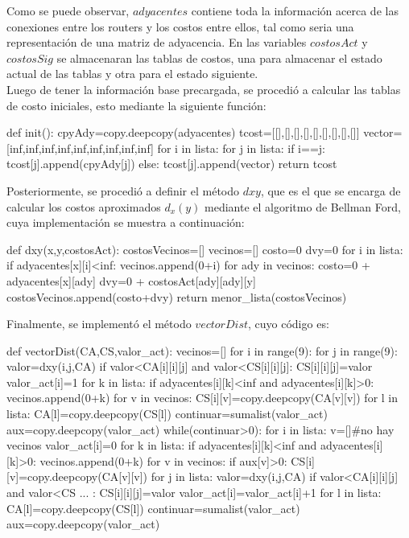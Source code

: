 \documentclass{article}
\begin{document}
Como se puede observar, $adyacentes$ contiene toda la información acerca de las conexiones entre los routers y los costos entre ellos, tal como seria una representación de una matriz de adyacencia. En las variables $costosAct$ y $costosSig$ se almacenaran las tablas de costos, una para almacenar el estado actual de las tablas y otra para el estado siguiente.\\
Luego de tener la información base precargada, se procedió a calcular las tablas de costo iniciales, esto mediante la siguiente función:
\begin{python}

def init():
    cpyAdy=copy.deepcopy(adyacentes)
    tcost=[[],[],[],[],[],[],[],[],[]]
    vector=[inf,inf,inf,inf,inf,inf,inf,inf,inf]
    for i in lista:
        for j in lista:
            if i==j:
                tcost[j].append(cpyAdy[j])
            else:
                tcost[j].append(vector)
    return tcost
\end{python}

Posteriormente, se procedió a definir el método $dxy$, que es el que se encarga de calcular los costos aproximados $d_x(y)$ mediante el algoritmo de Bellman Ford, cuya implementación se muestra a continuación:

\begin{python}
def dxy(x,y,costosAct):
    costosVecinos=[]
    vecinos=[]
    costo=0
    dvy=0
    for i in lista:
        if adyacentes[x][i]<inf:
            vecinos.append(0+i)
        for ady in vecinos:
            costo=0 + adyacentes[x][ady]
            dvy=0 + costosAct[ady][ady][y]
            costosVecinos.append(costo+dvy)
    return menor_lista(costosVecinos)
\end{python}

Finalmente, se implementó el método $vectorDist$, cuyo código es:

\begin{python}
def vectorDist(CA,CS,valor_act):
    vecinos=[]
    for i in range(9):
        for j in range(9):
            valor=dxy(i,j,CA)
            if valor<CA[i][i][j] and valor<CS[i][i][j]:
                CS[i][i][j]=valor
                valor_act[i]=1
            for k in lista:
                if adyacentes[i][k]<inf and adyacentes[i][k]>0:
                    vecinos.append(0+k)
            for v in vecinos:
                CS[i][v]=copy.deepcopy(CA[v][v])
    for l in lista:
        CA[l]=copy.deepcopy(CS[l])
    continuar=sumalist(valor_act)
    aux=copy.deepcopy(valor_act)
    while(continuar>0):
        for i in lista:
            v=[]#no hay vecinos
            valor_act[i]=0
            for k in lista:
                if adyacentes[i][k]<inf and adyacentes[i][k]>0:
                    vecinos.append(0+k)
            for v in vecinos:
                if aux[v]>0:
                    CS[i][v]=copy.deepcopy(CA[v][v])
                    for j in lista:
                        valor=dxy(i,j,CA)
                        if valor<CA[i][i][j] and valor<CS ... :
                            CS[i][i][j]=valor
                            valor_act[i]=valor_act[i]+1
        for l in lista:
            CA[l]=copy.deepcopy(CS[l])
        continuar=sumalist(valor_act)
        aux=copy.deepcopy(valor_act)
\end{python}
\end{document}
